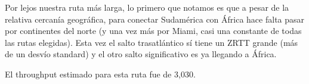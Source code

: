  Por lejos nuestra ruta más larga, lo primero que notamos es que a pesar de la relativa cercanía geográfica, para conectar Sudamérica con África hace falta pasar por continentes del norte (y una vez más por Miami, casi una constante de todas las rutas elegidas). Esta vez el salto trasatlántico sí tiene un ZRTT grande (más de un desvío standard) y el otro salto significativo es ya llegando a África.
 
 El throughput estimado para esta ruta fue de 3,030.